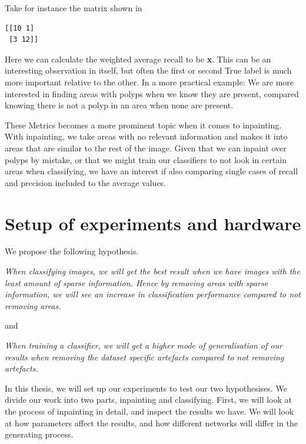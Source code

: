 Take for instance the matrix shown in \\
\begin{verbatim}
[[10 1]
 [3 12]]
\end{verbatim}
Here we can calculate the weighted average recall to be \textbf{x}. This can be an interesting observation in itself, but often the first or second True label is much more important relative to the other.  In a more practical example: We are more interested in finding areas with polyps when we know they are present, compared knowing there is not a polyp in an area when none are present. 

These Metrics becomes a more prominent topic when it comes to inpainting. With inpainting, we take areas with no relevant information and makes it into areas that are similar to the rest of the image. Given that we can inpaint over polyps by mistake, or that we might train our classifiers to not look in certain areas when classifying, we have an interest if also comparing single cases of recall and precision included to the average values.






\section{Setup of experiments and hardware}
We propose the following hypothesis.
\vspace{10px}

\textit{
When classifying images, we will get the best result when we have images with the least amount of sparse information. 
Hence by removing areas with sparse information,
we will see an increase in classification performance compared to not removing areas.
}

\vspace{5px}
and

\vspace{5px}
\textit{
When training a classifier, we will get a higher
mode of generalisation of our results when removing the dataset
specific artefacts compared to not removing artefacts.}
\vspace{5px}

In this thesis, we will set up our experiments to test our two hypothesises. 
We divide our work into two parts, inpainting and classifying. 
First, we will look at the process of inpainting in detail, and inspect the results we have.  
We will look at how parameters affect the results, and how different networks will differ in the generating process. 


